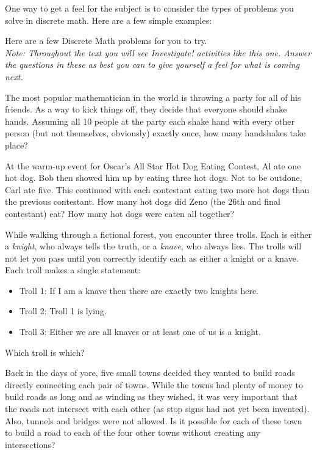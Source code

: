 \documentclass[12pt]{article}
\begin{document}
One way to get a feel for the subject is to consider the types of problems you solve in discrete math.  Here are a few simple examples:


\begin{activity}

Here are a few Discrete Math problems for you to try.  \\ \textit{Note: Throughout the text you will see \emph{Investigate!} activities like this one.  Answer the questions in these as best you can to give yourself a feel for what is coming next.}
\begin{questions}
\question The most popular mathematician in the world is throwing a party for all of his friends.  As a way to kick things off, they decide that everyone should shake hands.  Assuming all 10 people at the party each shake hand with every other person (but not themselves, obviously) exactly once, how many handshakes take place?

\question At the warm-up event for Oscar's All Star Hot Dog Eating Contest, Al ate one hot dog.  Bob then showed him up by eating three hot dogs.  Not to be outdone, Carl ate five.  This continued with each contestant eating two more hot dogs than the previous contestant. How many hot dogs did Zeno (the 26th and final contestant) eat? How many hot dogs were eaten all together?

\question While walking through a fictional forest, you encounter three trolls.  Each is either a {\em knight}, who always tells the truth, or a {\em knave}, who always lies.  The trolls will not let you pass until you correctly identify each as either a knight or a knave.  Each troll makes a single statement:
  \begin{itemize}
   \item[] Troll 1: If I am a knave then there are exactly two knights here. 
   \item[] Troll 2: Troll 1 is lying.
   \item[] Troll 3: Either we are all knaves or at least one of us is a knight.
  \end{itemize}
Which troll is which? 

\question Back in the days of yore, five small towns decided they wanted to build roads directly connecting each pair of towns. While the towns had plenty of money to build roads as long and as winding as they wished, it was very important that the roads not intersect with each other (as stop signs had not yet been invented). Also, tunnels and bridges were not allowed. Is it possible for each of these town to build a road to each of the four other towns without creating any intersections? 
\end{questions}
\end{activity}
\end{document}
